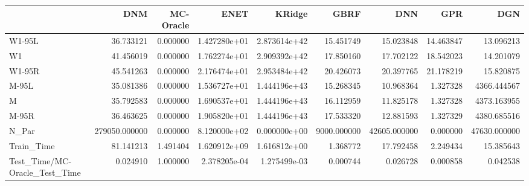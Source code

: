 \begin{tabular}{lrrrrrrrr}
\toprule
{} &            DNM &  MC-Oracle &          ENET &        KRidge &         GBRF &           DNN &        GPR &           DGN \\
\midrule
W1-95L                        &      36.733121 &   0.000000 &  1.427280e+01 &  2.873614e+42 &    15.451749 &     15.023848 &  14.463847 &     13.096213 \\
W1                            &      41.456019 &   0.000000 &  1.762274e+01 &  2.909392e+42 &    17.850160 &     17.702122 &  18.542023 &     14.201079 \\
W1-95R                        &      45.541263 &   0.000000 &  2.176474e+01 &  2.953484e+42 &    20.426073 &     20.397765 &  21.178219 &     15.820875 \\
M-95L                         &      35.081386 &   0.000000 &  1.536727e+01 &  1.444196e+43 &    15.268345 &     10.968364 &   1.327328 &   4366.444567 \\
M                             &      35.792583 &   0.000000 &  1.690537e+01 &  1.444196e+43 &    16.112959 &     11.825178 &   1.327328 &   4373.163955 \\
M-95R                         &      36.463625 &   0.000000 &  1.905820e+01 &  1.444196e+43 &    17.533320 &     12.881593 &   1.327329 &   4380.685516 \\
N\_Par                         &  279050.000000 &   0.000000 &  8.120000e+02 &  0.000000e+00 &  9000.000000 &  42605.000000 &   0.000000 &  47630.000000 \\
Train\_Time                    &      81.141213 &   1.491404 &  1.620912e+09 &  1.616812e+00 &     1.368772 &     17.792458 &   2.249434 &     15.385643 \\
Test\_Time/MC-Oracle\_Test\_Time &       0.024910 &   1.000000 &  2.378205e-04 &  1.275499e-03 &     0.000744 &      0.026728 &   0.000858 &      0.042538 \\
\bottomrule
\end{tabular}
